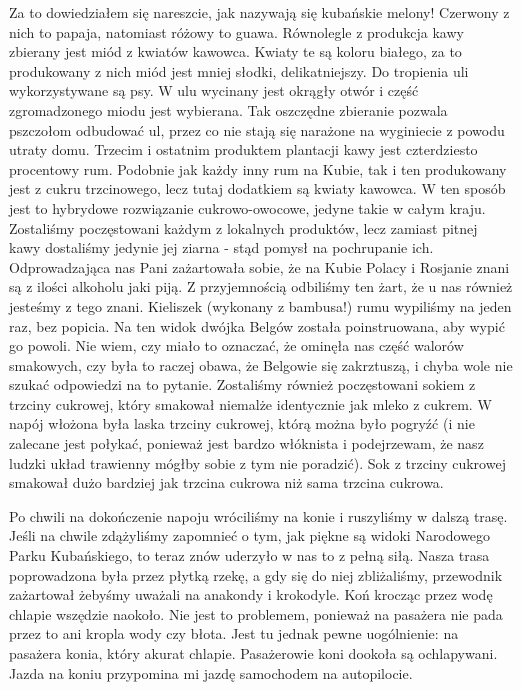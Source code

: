 Za to dowiedziałem się nareszcie, jak nazywają się kubańskie melony!
Czerwony z nich to papaja, natomiast różowy to guawa.
Równolegle z produkcja kawy zbierany jest miód z kwiatów kawowca.
Kwiaty te są koloru białego, za to produkowany z nich miód jest mniej słodki, delikatniejszy.
Do tropienia uli wykorzystywane są psy.
W ulu wycinany jest okrągły otwór i część zgromadzonego miodu jest wybierana.
Tak oszczędne zbieranie pozwala pszczołom odbudować ul, przez co nie stają się narażone na wyginiecie z powodu utraty domu.
Trzecim i ostatnim produktem plantacji kawy jest czterdziesto procentowy rum.
Podobnie jak każdy inny rum na Kubie, tak i ten produkowany jest z cukru trzcinowego, lecz tutaj dodatkiem są kwiaty kawowca.
W ten sposób jest to hybrydowe rozwiązanie cukrowo-owocowe, jedyne takie w całym kraju.
Zostaliśmy poczęstowani każdym z lokalnych produktów, lecz zamiast pitnej kawy dostaliśmy jedynie jej ziarna - stąd pomysł na pochrupanie ich.
Odprowadzająca nas Pani zażartowała sobie, że na Kubie Polacy i Rosjanie znani są z ilości alkoholu jaki piją.
Z przyjemnością odbiliśmy ten żart, że u nas również jesteśmy z tego znani.
Kieliszek (wykonany z bambusa!) rumu wypiliśmy na jeden raz, bez popicia.
Na ten widok dwójka Belgów została poinstruowana, aby wypić go powoli.
Nie wiem, czy miało to oznaczać, że ominęła nas część walorów smakowych, czy była to raczej obawa, że Belgowie się zakrztuszą, i chyba wole nie szukać odpowiedzi na to pytanie.
Zostaliśmy również poczęstowani sokiem z trzciny cukrowej, który smakował niemalże identycznie jak mleko z cukrem.
W napój włożona była laska trzciny cukrowej, którą można było pogryźć (i nie zalecane jest połykać, ponieważ jest bardzo włóknista i podejrzewam, że nasz ludzki układ trawienny mógłby sobie z tym nie poradzić).
Sok z trzciny cukrowej smakował dużo bardziej jak trzcina cukrowa niż sama trzcina cukrowa.
\par Po chwili na dokończenie napoju wróciliśmy na konie i ruszyliśmy w dalszą trasę.
Jeśli na chwile zdążyliśmy zapomnieć o tym, jak piękne są widoki Narodowego Parku Kubańskiego, to teraz znów uderzyło w nas to z pełną siłą.
Nasza trasa poprowadzona była przez płytką rzekę, a gdy się do niej zbliżaliśmy, przewodnik zażartował żebyśmy uważali na anakondy i krokodyle.
Koń krocząc przez wodę chlapie wszędzie naokoło.
Nie jest to problemem, ponieważ na pasażera nie pada przez to ani kropla wody czy błota.
Jest tu jednak pewne uogólnienie: na pasażera konia, który akurat chlapie.
Pasażerowie koni dookoła są ochlapywani.
Jazda na koniu przypomina mi jazdę samochodem na autopilocie.
